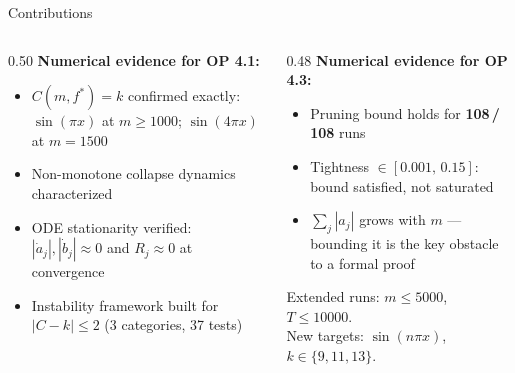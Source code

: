 \documentclass[aspectratio=169, 10pt]{beamer}
\newcommand{\fstar}{f^\ast}
\begin{document}
\begin{frame}{Contributions}
  \begin{columns}[T]
    \begin{column}{0.50\textwidth}
      \textbf{Numerical evidence for OP 4.1:}
      \begin{itemize}
        \item[\color{darkgreen}\checkmark]
              $C(m,\fstar)=k$ confirmed exactly:
              $\sin(\pi x)$ at $m\!\geq\!1000$;
              $\sin(4\pi x)$ at $m\!=\!1500$
        \item[\color{darkgreen}\checkmark]
              Non-monotone collapse dynamics characterized
        \item[\color{darkgreen}\checkmark]
              ODE stationarity verified:
              $|\dot{a}_j|,|\dot{b}_j|\approx 0$
              and $R_j\approx 0$ at convergence
        \item[\color{darkgreen}\checkmark]
              Instability framework built for
              $|C-k|\leq 2$ (3 categories, 37 tests)
      \end{itemize}
    \end{column}
    \begin{column}{0.48\textwidth}
      \textbf{Numerical evidence for OP 4.3:}
      \begin{itemize}
        \item[\color{darkgreen}\checkmark]
              Pruning bound holds for \textbf{108\,/\,108} runs
        \item[\color{darkgreen}\checkmark]
              Tightness $\in[0.001,\,0.15]$:
              bound satisfied, not saturated
        \item[\color{auorange}$\circ$]
              $\sum_j|a_j|$ grows with $m$ —
              bounding it is the key obstacle
              to a formal proof
      \end{itemize}
      \vspace{0.5em}
      \begin{tcolorbox}[slideboxA, title={Ongoing}]
        \small
        Extended runs: $m\!\leq\!5000$, $T\!\leq\!10000$.\\
        New targets: $\sin(n\pi x)$, $k\in\{9,11,13\}$.
      \end{tcolorbox}
    \end{column}
  \end{columns}
\end{frame}
\end{document}
